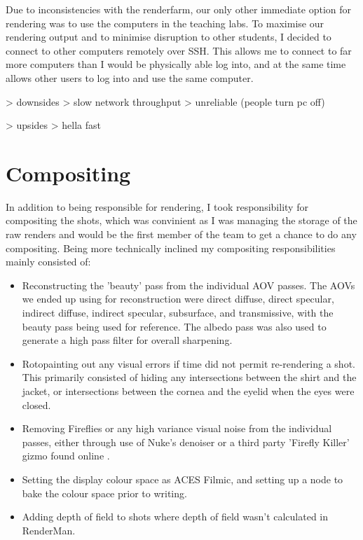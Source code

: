 \documentclass[11pt]{article}
\begin{document}
Due to inconsistencies with the renderfarm, our only other immediate option for rendering was to use the computers in the teaching labs. To maximise our rendering output and to minimise disruption to other students, I decided to connect to other computers remotely over SSH. This allows me to connect to far more computers than I would be physically able log into, and at the same time allows other users to log into and use the same computer.

> downsides
	> slow network throughput
	> unreliable (people turn pc off)

> upsides
	> hella fast

\cite{pssh}
\cite{martin_2008}

\section{Compositing}

In addition to being responsible for rendering, I took responsibility for compositing the shots, which was convinient as I was managing the storage of the raw renders and would be the first member of the team to get a chance to do any compositing. Being more technically inclined my compositing responsibilities mainly consisted of:

\begin{itemize}

\item Reconstructing the 'beauty' pass from the individual AOV passes. The AOVs we ended up using for reconstruction were direct diffuse, direct specular, indirect diffuse, indirect specular, subsurface, and transmissive, with the beauty pass being used for reference. The albedo pass was also used to generate a high pass filter for overall sharpening.

\item Rotopainting out any visual errors if time did not permit re-rendering a shot. This primarily consisted of hiding any intersections between the shirt and the jacket, or intersections between the cornea and the eyelid when the eyes were closed.

\item Removing Fireflies or any high variance visual noise from the individual passes, either through use of Nuke's denoiser or a third party 'Firefly Killer' gizmo found online \cite{muller_2015}.

\item Setting the display colour space as ACES Filmic, and setting up a node to bake the colour space prior to writing.

\item Adding depth of field to shots where depth of field wasn't calculated in RenderMan.

\end{itemize}
\end{document}

